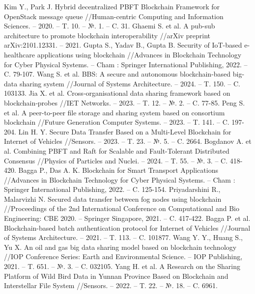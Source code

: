 
\begin{thebibliography}{XXX}
 Kim Y., Park J. Hybrid decentralized PBFT Blockchain Framework for OpenStack message queue //Human-centric Computing and Information Sciences. – 2020. – T. 10. – №. 1. – C. 31.
  Ghaemi S. et al. A pub-sub architecture to promote blockchain interoperability //arXiv preprint arXiv:2101.12331. – 2021.
 Gupta S., Yadav B., Gupta B. Security of IoT-based e-healthcare applications using blockchain //Advances in Blockchain Technology for Cyber Physical Systems. – Cham : Springer International Publishing, 2022. – C. 79-107.
 Wang S. et al. BBS: A secure and autonomous blockchain-based big-data sharing system //Journal of Systems Architecture. – 2024. – T. 150. – C. 103133.
 Jia X. et al. Cross‐organisational data sharing framework based on blockchain‐probes //IET Networks. – 2023. – T. 12. – №. 2. – C. 77-85.
 Peng S. et al. A peer-to-peer file storage and sharing system based on consortium blockchain //Future Generation Computer Systems. – 2023. – T. 141. – C. 197-204.
 Lin H. Y. Secure Data Transfer Based on a Multi-Level Blockchain for Internet of Vehicles //Sensors. – 2023. – T. 23. – №. 5. – C. 2664.
 Bogdanov A. et al. Combining PBFT and Raft for Scalable and Fault-Tolerant Distributed Consensus //Physics of Particles and Nuclei. – 2024. – T. 55. – №. 3. – C. 418-420.
 Bagga P., Das A. K. Blockchain for Smart Transport Applications //Advances in Blockchain Technology for Cyber Physical Systems. – Cham : Springer International Publishing, 2022. – C. 125-154.
 Priyadarshini R., Malarvizhi N. Secured data transfer between fog nodes using blockchain //Proceedings of the 2nd International Conference on Computational and Bio Engineering: CBE 2020. – Springer Singapore, 2021. – C. 417-422. 
 Bagga P. et al. Blockchain-based batch authentication protocol for Internet of Vehicles //Journal of Systems Architecture. – 2021. – T. 113. – C. 101877.
 Wang Y. Y., Huang S., Yu X. An oil and gas big data sharing model based on blockchain technology //IOP Conference Series: Earth and Environmental Science. – IOP Publishing, 2021. – T. 651. – №. 3. – C. 032105.
 Yang H. et al. A Research on the Sharing Platform of Wild Bird Data in Yunnan Province Based on Blockchain and Interstellar File System //Sensors. – 2022. – T. 22. – №. 18. – C. 6961.

\end{thebibliography}
